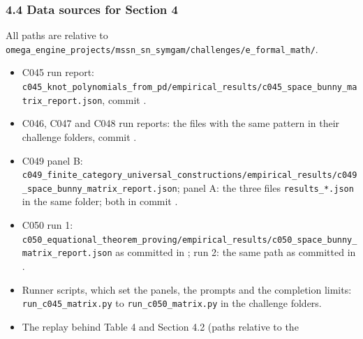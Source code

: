 \documentclass[
  11pt,
]{article}
\providecommand{\tightlist}{%
  \setlength{\itemsep}{0pt}\setlength{\parskip}{0pt}}
\begin{document}
\hypertarget{data-sources-for-section-4}{%
\subsubsection{4.4 Data sources for Section
4}\label{data-sources-for-section-4}}

All paths are relative to
\texttt{omega\_\allowbreak{}engine\_\allowbreak{}projects/\allowbreak{}mssn\_\allowbreak{}sn\_\allowbreak{}symgam/\allowbreak{}challenges/\allowbreak{}e\_\allowbreak{}formal\_\allowbreak{}math/\allowbreak{}}.

\begin{itemize}
\tightlist
\item
  C045 run report:
  \texttt{c045\_\allowbreak{}knot\_\allowbreak{}polynomials\_\allowbreak{}from\_\allowbreak{}pd/\allowbreak{}empirical\_\allowbreak{}results/\allowbreak{}c045\_\allowbreak{}space\_\allowbreak{}bunny\_\allowbreak{}matrix\_\allowbreak{}report.json},
  commit \texttt{}.
\item
  C046, C047 and C048 run reports: the files with the same pattern in
  their challenge folders, commit
  \texttt{}.
\item
  C049 panel B:
  \texttt{c049\_\allowbreak{}finite\_\allowbreak{}category\_\allowbreak{}universal\_\allowbreak{}constructions/\allowbreak{}empirical\_\allowbreak{}results/\allowbreak{}c049\_\allowbreak{}space\_\allowbreak{}bunny\_\allowbreak{}matrix\_\allowbreak{}report.json};
  panel A: the three files \texttt{results\_\allowbreak{}*.json} in the
  same folder; both in commit
  \texttt{}.
\item
  C050 run 1:
  \texttt{c050\_\allowbreak{}equational\_\allowbreak{}theorem\_\allowbreak{}proving/\allowbreak{}empirical\_\allowbreak{}results/\allowbreak{}c050\_\allowbreak{}space\_\allowbreak{}bunny\_\allowbreak{}matrix\_\allowbreak{}report.json}
  as committed in
  \texttt{}; run 2:
  the same path as committed in
  \texttt{}.
\item
  Runner scripts, which set the panels, the prompts and the completion
  limits: \texttt{run\_\allowbreak{}c045\_\allowbreak{}matrix.py} to
  \texttt{run\_\allowbreak{}c050\_\allowbreak{}matrix.py} in the
  challenge folders.
\item
  The replay behind Table 4 and Section 4.2 (paths relative to the

\end{itemize}
\end{document}

